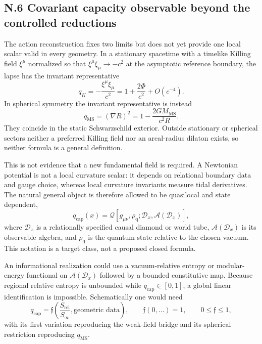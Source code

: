 \documentclass[11pt]{article}
\begin{document}
\subsection*{N.6 Covariant capacity observable beyond the controlled reductions}

The action reconstruction fixes two limits but does not yet provide one local scalar valid in every geometry. In a stationary spacetime with a timelike Killing field $\xi^\mu$ normalized so that $\xi^\mu\xi_\mu\to-c^2$ at the asymptotic reference boundary, the lapse has the invariant representative
\[
q_K=-\frac{\xi^\mu\xi_\mu}{c^2}
=1+\frac{2\Phi}{c^2}+O(c^{-4}).
\]
In spherical symmetry the invariant representative is instead
\[
q_{\mathrm{MS}}=(\nabla R)^2
=1-\frac{2GM_{\mathrm{MS}}}{c^2R}.
\]
They coincide in the static Schwarzschild exterior. Outside stationary or spherical sectors neither a preferred Killing field nor an areal-radius dilaton exists, so neither formula is a general definition.

This is not evidence that a new fundamental field is required. A Newtonian potential is not a local curvature scalar: it depends on relational boundary data and gauge choice, whereas local curvature invariants measure tidal derivatives. The natural general object is therefore allowed to be quasilocal and state dependent,
\[
q_{\mathrm{cap}}(x)
=
\mathcal Q\!\left[
g_{\mu\nu},\rho_{\mathrm q};
\mathcal D_x,\mathcal A(\mathcal D_x)
\right],
\]
where $\mathcal D_x$ is a relationally specified causal diamond or world tube, $\mathcal A(\mathcal D_x)$ is its observable algebra, and $\rho_{\mathrm q}$ is the quantum state relative to the chosen vacuum. This notation is a target class, not a proposed closed formula.

An informational realization could use a vacuum-relative entropy or modular-energy functional on $\mathcal A(\mathcal D_x)$ followed by a bounded constitutive map. Because regional relative entropy is unbounded while $q_{\mathrm{cap}}\in[0,1]$, a global linear identification is impossible. Schematically one would need
\[
q_{\mathrm{cap}}
=\mathfrak f\!\left(
\frac{S_{\mathrm{rel}}}{S_\infty},
\text{geometric data}
\right),
\qquad
\mathfrak f(0,\ldots)=1,
\qquad
0\leq\mathfrak f\leq1,
\]
with its first variation reproducing the weak-field bridge and its spherical restriction reproducing $q_{\mathrm{MS}}$.
\end{document}
